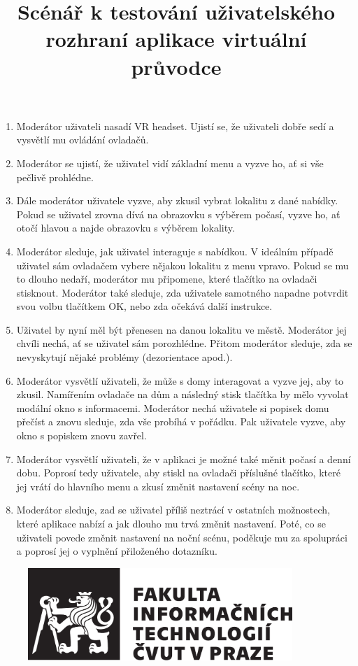 \documentclass{article}
\title{Scénář k testování uživatelského rozhraní aplikace virtuální průvodce}
\date{}
\begin{document}
\maketitle	
	\begin{enumerate}
		\item Moderátor uživateli nasadí VR headset. Ujistí se, že uživateli dobře sedí a vysvětlí mu ovládání ovladačů.
		\item Moderátor se ujistí, že uživatel vidí základní menu a vyzve ho, ať si vše pečlivě prohlédne.
		\item Dále moderátor uživatele vyzve, aby zkusil vybrat lokalitu z dané nabídky. Pokud se uživatel zrovna dívá na obrazovku s výběrem počasí, vyzve ho, ať otočí hlavou a najde obrazovku s výběrem lokality. 
		\item Moderátor sleduje, jak uživatel interaguje s nabídkou. V ideálním případě uživatel sám ovladačem vybere nějakou lokalitu z menu vpravo. Pokud se mu to dlouho nedaří, moderátor mu připomene, které tlačítko na ovladači stisknout. Moderátor také sleduje, zda uživatele samotného napadne potvrdit svou volbu tlačítkem OK, nebo zda očekává další instrukce.
		\item Uživatel by nyní měl být přenesen na danou lokalitu ve městě. Moderátor jej chvíli nechá, ať se uživatel sám porozhlédne. Přitom moderátor sleduje, zda se nevyskytují nějaké problémy (dezorientace apod.).
		\item Moderátor vysvětlí uživateli, že může s domy interagovat a vyzve jej, aby to zkusil. Namířením ovladače na dům a následný stisk tlačítka by mělo vyvolat modální okno s informacemi. Moderátor nechá uživatele si popisek domu přečíst a znovu sleduje, zda vše probíhá v pořádku. Pak uživatele vyzve, aby okno s popiskem znovu zavřel.
		\item Moderátor vysvětlí uživateli, že v aplikaci je možné také měnit počasí a denní dobu. Poprosí tedy uživatele, aby stiskl na ovladači příslušné tlačítko, které jej vrátí do hlavního menu a zkusí změnit nastavení scény na noc.
		\item Moderátor sleduje, zad se uživatel příliš neztrácí v ostatních možnostech, které aplikace nabízí a jak dlouho mu trvá změnit nastavení. Poté, co se uživateli povede změnit nastavení na noční scénu, poděkuje mu za spolupráci a poprosí jej o vyplnění přiloženého dotazníku.
	\end{enumerate}
	
\thispagestyle{empty}
\begin{figure}
\centering
  		\includegraphics[width=10cm,keepaspectratio]{cvut-logo-bw.pdf}
\end{figure}
\end{document}
